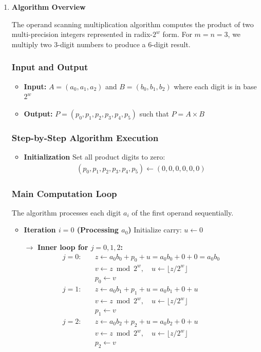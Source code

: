 \documentclass{article}
\begin{document}
\begin{enumerate}
    \item \textbf{Algorithm Overview}

The operand scanning multiplication algorithm computes the product of two multi-precision integers represented in radix-$2^w$ form. For $m = n = 3$, we multiply two 3-digit numbers to produce a 6-digit result.

\subsubsection*{Input and Output}
\begin{itemize}
    \item \textbf{Input:} $A = (a_0, a_1, a_2)$ and $B = (b_0, b_1, b_2)$ where each digit is in base $2^w$
    \item \textbf{Output:} $P = (p_0, p_1, p_2, p_3, p_4, p_5)$ such that $P = A \times B$
\end{itemize}

\subsubsection*{Step-by-Step Algorithm Execution}
\begin{itemize}
  \item \textbf{Initialization}
  Set all product digits to zero:
  \begin{align*}
  (p_0, p_1, p_2, p_3, p_4, p_5) \leftarrow (0, 0, 0, 0, 0, 0)
  \end{align*}
\end{itemize}

\subsubsection*{Main Computation Loop}

The algorithm processes each digit $a_i$ of the first operand sequentially.
\begin{itemize}

\item \textbf{Iteration $i = 0$ (Processing $a_0$)}
Initialize carry: $u \leftarrow 0$

$\rightarrow$ \textbf{Inner loop for $j = 0, 1, 2$:}
\begin{align*}
j = 0: \quad & z \leftarrow a_0 b_0 + p_0 + u = a_0 b_0 + 0 + 0 = a_0 b_0 \\
& v \leftarrow z \bmod 2^w, \quad u \leftarrow \lfloor z/2^w \rfloor \\
& p_0 \leftarrow v \\[0.5em]
j = 1: \quad & z \leftarrow a_0 b_1 + p_1 + u = a_0 b_1 + 0 + u \\
& v \leftarrow z \bmod 2^w, \quad u \leftarrow \lfloor z/2^w \rfloor \\
& p_1 \leftarrow v \\[0.5em]
j = 2: \quad & z \leftarrow a_0 b_2 + p_2 + u = a_0 b_2 + 0 + u \\
& v \leftarrow z \bmod 2^w, \quad u \leftarrow \lfloor z/2^w \rfloor \\
& p_2 \leftarrow v
\end{align*}


\end{itemize}
\end{enumerate}
\end{document}
